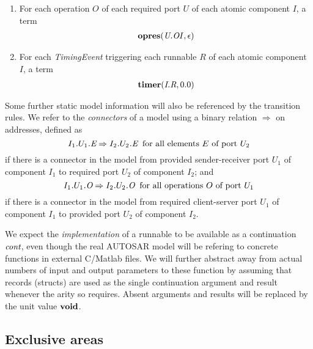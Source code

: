 \documentclass[twocolumn]{article}
\begin{document}
\begin{enumerate}
\item For each operation $O$ of each required port $U$ of each atomic component $I$, a term
$$
\begin{array}{c}
	\opres{\Te{O}{U}{I}}{\epsilon}
\end{array}
$$

\item For each \emph{TimingEvent} triggering each runnable $R$ of each atomic component $I$, a term
$$
\begin{array}{c}
	\timer{\Tr{R}{I}}{0.0}
\end{array}
$$

\end{enumerate}

Some further static model information will also be referenced by the transition rules. We refer to the \emph{connectors} of a model using a binary relation $\Rightarrow$ on addresses, defined as
$$
	\Tconnect{\Tep{E}{$U_1$}{$I_1$}}{\Tep{E}{$U_2$}{$I_2$}} \;\;\text{for all elements $E$ of port $U_2$}
$$
if there is a connector in the model from provided sender-receiver port $U_1$ of component $I_1$ to required port $U_2$ of component $I_2$; and
$$
	\Tconnect{\Top{O}{$U_1$}{$I_1$}}{\Top{O}{$U_2$}{$I_2$}} \;\;\text{for all operations $O$ of port $U_1$}
$$
if there is a connector in the model from required client-server port $U_1$ of component $I_1$ to provided port $U_2$ of component $I_2$.

We expect the \emph{implementation} of a runnable to be available as a continuation $\Cont$, even though the real AUTOSAR model will be refering to concrete functions in external C/Matlab files. We will further abstract away from actual numbers of input and output parameters to these function by assuming that records (structs) are used as the single continuation argument and result whenever the arity so requires. Absent arguments and results will be replaced by the unit value $\void$.

\subsection{Exclusive areas}
\end{document}

